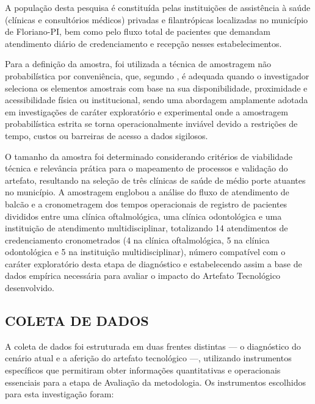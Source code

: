 A população desta pesquisa é constituída pelas instituições de assistência à saúde (clínicas e consultórios médicos) privadas e filantrópicas localizadas no município de Floriano-PI, bem como pelo fluxo total de pacientes que demandam atendimento diário de credenciamento e recepção nesses estabelecimentos.

Para a definição da amostra, foi utilizada a técnica de amostragem não probabilística por conveniência, que, segundo , é adequada quando o investigador seleciona os elementos amostrais com base na sua disponibilidade, proximidade e acessibilidade física ou institucional, sendo uma abordagem amplamente adotada em investigações de caráter exploratório e experimental onde a amostragem probabilística estrita se torna operacionalmente inviável devido a restrições de tempo, custos ou barreiras de acesso a dados sigilosos.

O tamanho da amostra foi determinado considerando critérios de viabilidade técnica e relevância prática para o mapeamento de processos e validação do artefato, resultando na seleção de três clínicas de saúde de médio porte atuantes no município. A amostragem englobou a análise do fluxo de atendimento de balcão e a cronometragem dos tempos operacionais de registro de pacientes divididos entre uma clínica oftalmológica, uma clínica odontológica e uma instituição de atendimento multidisciplinar, totalizando 14 atendimentos de credenciamento cronometrados (4 na clínica oftalmológica, 5 na clínica odontológica e 5 na instituição multidisciplinar), número compatível com o caráter exploratório desta etapa de diagnóstico e estabelecendo assim a base de dados empírica necessária para avaliar o impacto do Artefato Tecnológico desenvolvido.

\subsection{COLETA DE DADOS}
\label{subsec:coleta-dados}

A coleta de dados foi estruturada em duas frentes distintas — o diagnóstico do cenário atual e a aferição do artefato tecnológico —, utilizando instrumentos específicos que permitiram obter informações quantitativas e operacionais essenciais para a etapa de Avaliação da metodologia. Os instrumentos escolhidos para esta investigação foram:

